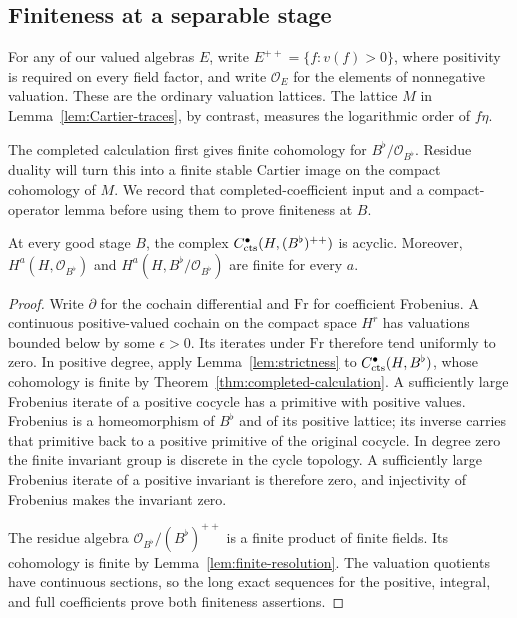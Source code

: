 \subsection{Finiteness at a separable stage}

For any of our valued algebras $E$, write
$E^{++}=\{f:v(f)>0\}$, where positivity is required on every field
factor, and write $\mathcal O_E$ for the elements of nonnegative
valuation.  These are the ordinary valuation lattices.  The lattice
$M$ in Lemma~\ref{lem:Cartier-traces}, by contrast, measures the
logarithmic order of $f\eta$.

The completed calculation first gives finite cohomology for
$B^\flat/\mathcal O_{B^\flat}$.  Residue duality will turn this
into a finite stable Cartier image on the compact cohomology of $M$.
We record that completed-coefficient input and a compact-operator
lemma before using them to prove finiteness at $B$.

\begin{lemma}
\label{lem:completed-positive}
At every good stage $B$, the complex
$C^\bullet_{\mathrm{cts}}(H,(B^\flat)^{++})$ is acyclic.  Moreover,
$H^a(H,\mathcal O_{B^\flat})$ and
$H^a(H,B^\flat/\mathcal O_{B^\flat})$ are finite for every $a$.
\end{lemma}

\begin{proof}
Write $\partial$ for the cochain differential and $\mathrm{Fr}$ for
coefficient Frobenius.  A continuous positive-valued cochain on
the compact space $H^r$ has valuations bounded below by some
$\epsilon>0$.  Its iterates under $\mathrm{Fr}$ therefore tend
uniformly to zero.  In positive degree, apply
Lemma~\ref{lem:strictness} to $C^\bullet_{\mathrm{cts}}(H,B^\flat)$, whose cohomology is
finite by Theorem~\ref{thm:completed-calculation}.  A sufficiently
large Frobenius iterate of a positive cocycle has a primitive with
positive values.  Frobenius is a homeomorphism of $B^\flat$ and of
its positive lattice; its inverse carries that primitive back to a
positive primitive of the original cocycle.  In degree zero the
finite invariant group is discrete in the cycle topology.  A
sufficiently large Frobenius iterate of a positive invariant is
therefore zero, and injectivity of Frobenius makes the invariant zero.

The residue algebra
$\mathcal O_{B^\flat}/(B^\flat)^{++}$ is a finite product of finite
fields.  Its cohomology is finite by
Lemma~\ref{lem:finite-resolution}.  The valuation quotients have
continuous sections, so the long exact sequences for the positive,
integral, and full coefficients prove both finiteness assertions.
\end{proof}

